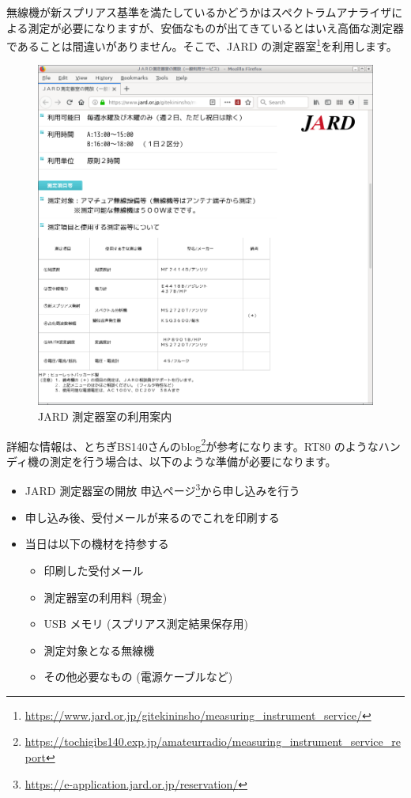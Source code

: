 \documentclass[a4j,oneside]{ujbook}
\begin{document}
無線機が新スプリアス基準を満たしているかどうかはスペクトラムアナライザによる測定が必要になりますが、安価なものが出てきているとはいえ高価な測定器であることは間違いがありません。そこで、JARD の測定器室\footnote{\url{https://www.jard.or.jp/gitekininsho/measuring_instrument_service/}}を利用します。
\begin{figure}[H]
 \centering
 \includegraphics[width=15cm]{img/jard-measureroom.png}
 \caption{JARD 測定器室の利用案内}
\end{figure}
詳細な情報は、とちぎBS140さんのblog\footnote{\url{https://tochigibs140.exp.jp/amateurradio/measuring_instrument_service_report}}が参考になります。RT80 のようなハンディ機の測定を行う場合は、以下のような準備が必要になります。
\begin{itemize}
 \item JARD 測定器室の開放 申込ページ\footnote{\url{https://e-application.jard.or.jp/reservation/}}から申し込みを行う
 \item 申し込み後、受付メールが来るのでこれを印刷する
 \item 当日は以下の機材を持参する
  \begin{itemize}
   \item 印刷した受付メール
   \item 測定器室の利用料 (現金)
   \item USB メモリ (スプリアス測定結果保存用)
   \item 測定対象となる無線機
   \item その他必要なもの (電源ケーブルなど)
  \end{itemize}
\end{itemize}
\end{document}
